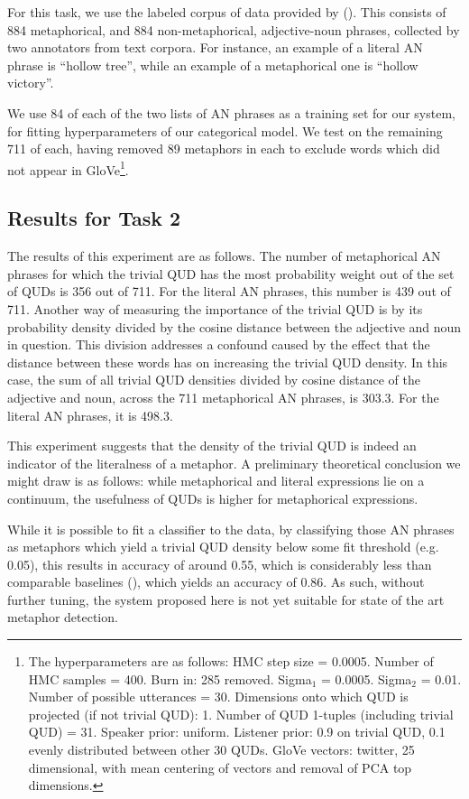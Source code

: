 \documentclass[10pt,letterpaper,twocolumn]{article}
\begin{document}
For this task, we use the labeled corpus of data provided by (\cite{tsvetkov2014metaphor}). This consists of 884 metaphorical, and 884 non-metaphorical, adjective-noun phrases, collected by two annotators from text corpora. For instance, an example of a literal AN phrase is ``hollow tree'', while an example of a metaphorical one is ``hollow victory''.

We use 84 of each of the two lists of AN phrases as a training set for our system, for fitting hyperparameters of our categorical model. We test on the remaining 711 of each, having removed 89 metaphors in each to exclude words which did not appear in GloVe\footnote{The hyperparameters are as follows: HMC step size = 0.0005. Number of HMC samples = 400. Burn in: 285 removed. Sigma$_1$ = 0.0005. Sigma$_2$ = 0.01. Number of possible utterances = 30. Dimensions onto which QUD is projected (if not trivial QUD): 1. Number of QUD 1-tuples (including trivial QUD) = 31. Speaker prior: uniform. Listener prior: 0.9 on trivial QUD, 0.1 evenly distributed between other 30 QUDs. GloVe vectors: twitter, 25 dimensional, with mean centering of vectors and removal of PCA top dimensions.}.

\subsection{Results for Task 2}

The results of this experiment are as follows. The number of metaphorical AN phrases for which the trivial QUD has the most probability weight out of the set of QUDs is 356 out of 711. For the literal AN phrases, this number is 439 out of 711. Another way of measuring the importance of the trivial QUD is by its probability density divided by the cosine distance between the adjective and noun in question. This division addresses a confound caused by the effect that the distance between these words has on increasing the trivial QUD density. In this case, the sum of all trivial QUD densities divided by cosine distance of the adjective and noun, across the 711 metaphorical AN phrases, is  303.3. For the literal AN phrases, it is 498.3.

This experiment suggests that the density of the trivial QUD is indeed an indicator of the literalness of a metaphor. A preliminary theoretical conclusion we might draw is as follows: while metaphorical and literal expressions lie on a continuum, the usefulness of QUDs is higher for metaphorical expressions.

While it is possible to fit a classifier to the data, by classifying those AN phrases as metaphors which yield a trivial QUD density below some fit threshold (e.g. 0.05), this results in accuracy of around 0.55, which is considerably less than comparable baselines (\cite{tsvetkov2014metaphor}), which yields an accuracy of 0.86. As such, without further tuning, the system proposed here is not yet suitable for state of the art metaphor detection.
\end{document}
